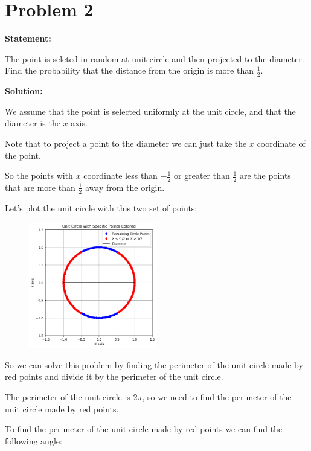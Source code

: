 \section*{Problem 2}

\textbf{Statement:}

The point is seleted in random at unit circle and then projected to the diameter.
Find the probability that the distance from the origin is more than $\frac{1}{2}.$

\noindent\textbf{Solution:}

We assume that the point is selected uniformly at the unit circle, and that the
diameter is the $x$ axis.

Note that to project a point to the diameter we can just take the $x$ coordinate
of the point.

So the points with $x$ coordinate less than $-\frac{1}{2}$ or greater than
$\frac{1}{2}$ are the points that are more than $\frac{1}{2}$ away from the origin.

Let's plot the unit circle with this two set of points:

\begin{figure}[H]
    \centering
    \includegraphics[width=0.5\textwidth]{images/unit-circle.png}
\end{figure}

So we can solve this problem by finding the perimeter of the unit circle made by
red points and divide it by the perimeter of the unit circle.

The perimeter of the unit circle is $2\pi$, so we need to find the perimeter of
the unit circle made by red points.

To find the perimeter of the unit circle made by red points we can find the following angle:


